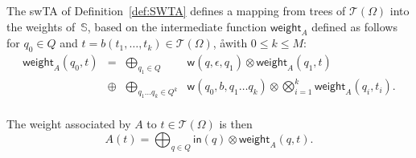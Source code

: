 \documentclass[runningheads]{llncs}
\newcommand{\T}{\mathcal{T}}
\newcommand{\Semiring}{\mathbb{S}}
\def\SWTA{\textsf{swTA}\xspace}
\def\weight{\mathsf{weight}}
\def\wei{\mathsf{w}}
\begin{document}
\noindent
The \SWTA of Definition~\ref{def:SWTA} defines a mapping 
from trees of $\T(\Omega)$ into the weights of~$\Semiring$,
based on the intermediate function $\weight_A$
defined as follows for $q_0 \in Q$ and 
$t = b(t_1,\ldots, t_k) \in \T(\Omega)$,
åwith $0 \leq k \leq M$:
\[
\begin{array}{rccl}
\weight_A(q_0, t) & = & 
   \displaystyle\bigoplus_{q_1 \in Q} &
   \wei(q, \epsilon, q_1) \otimes \weight_A(q_1, t)\\
 & \oplus & \displaystyle\bigoplus_{q_1 \ldots q_k \in Q^k} &
              \wei(q_0, b, q_1 \ldots q_k ) 
   \otimes \displaystyle\bigotimes_{i=1}^{k}
           \weight_A(q_i, t_i).\\
\end{array}
\]

\medskip\noindent
The weight associated by $A$ to  $t \in \T(\Omega)$ is then
\begin{equation}
A(t)  = 
\displaystyle\bigoplus_{q \in Q} \mathsf{in}(q) \mathop{\otimes} \weight_A(q, t).
\label{eq:weightTA}
\end{equation}
\end{document}
